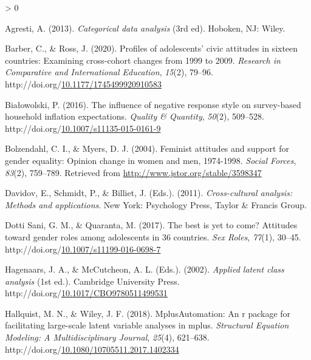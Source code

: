 \documentclass[12pt,twoside]{reedthesis}
\newlength{\cslhangindent}
\newenvironment{CSLReferences}[2] %
 {%
  \setlength{\parindent}{0pt}
  \ifodd #1 \everypar{\setlength{\hangindent}{\cslhangindent}}\ignorespaces\fi
  \ifnum #2 > 0
  \setlength{\parskip}{#2\baselineskip}
  \fi
 }%
 {}
\begin{document}
\hypertarget{refs}{}
\begin{CSLReferences}{1}{0}
\leavevmode\hypertarget{ref-agresti_categorical_2013}{}%
Agresti, A. (2013). \emph{Categorical data analysis} (3rd ed). Hoboken, {NJ}: Wiley.

\leavevmode\hypertarget{ref-barber_profiles_2020}{}%
Barber, C., \& Ross, J. (2020). Profiles of adolescents' civic attitudes in sixteen countries: Examining cross-cohort changes from 1999 to 2009. \emph{Research in Comparative and International Education}, \emph{15}(2), 79--96. http://doi.org/\href{https://doi.org/10.1177/1745499920910583}{10.1177/1745499920910583}

\leavevmode\hypertarget{ref-bialowolski_influence_2016}{}%
Białowolski, P. (2016). The influence of negative response style on survey-based household inflation expectations. \emph{Quality \& Quantity}, \emph{50}(2), 509--528. http://doi.org/\href{https://doi.org/10.1007/s11135-015-0161-9}{10.1007/s11135-015-0161-9}

\leavevmode\hypertarget{ref-bolzendahl_feminist_2004}{}%
Bolzendahl, C. I., \& Myers, D. J. (2004). Feminist attitudes and support for gender equality: Opinion change in women and men, 1974-1998. \emph{Social Forces}, \emph{83}(2), 759--789. Retrieved from \url{http://www.jstor.org/stable/3598347}

\leavevmode\hypertarget{ref-davidov_cross-cultural_2011}{}%
Davidov, E., Schmidt, P., \& Billiet, J. (Eds.). (2011). \emph{Cross-cultural analysis: Methods and applications}. New York: Psychology Press, Taylor \& Francis Group.

\leavevmode\hypertarget{ref-dotti_sani_best_2017}{}%
Dotti Sani, G. M., \& Quaranta, M. (2017). The best is yet to come? Attitudes toward gender roles among adolescents in 36 countries. \emph{Sex Roles}, \emph{77}(1), 30--45. http://doi.org/\href{https://doi.org/10.1007/s11199-016-0698-7}{10.1007/s11199-016-0698-7}

\leavevmode\hypertarget{ref-hagenaars_applied_2002}{}%
Hagenaars, J. A., \& McCutcheon, A. L. (Eds.). (2002). \emph{Applied latent class analysis} (1st ed.). Cambridge University Press. http://doi.org/\href{https://doi.org/10.1017/CBO9780511499531}{10.1017/CBO9780511499531}

\leavevmode\hypertarget{ref-hallquist_mplusautomation_2018}{}%
Hallquist, M. N., \& Wiley, J. F. (2018). {MplusAutomation}: An r package for facilitating large-scale latent variable analyses in mplus. \emph{Structural Equation Modeling: A Multidisciplinary Journal}, \emph{25}(4), 621--638. http://doi.org/\href{https://doi.org/10.1080/10705511.2017.1402334}{10.1080/10705511.2017.1402334}


\end{CSLReferences}
\end{document}
